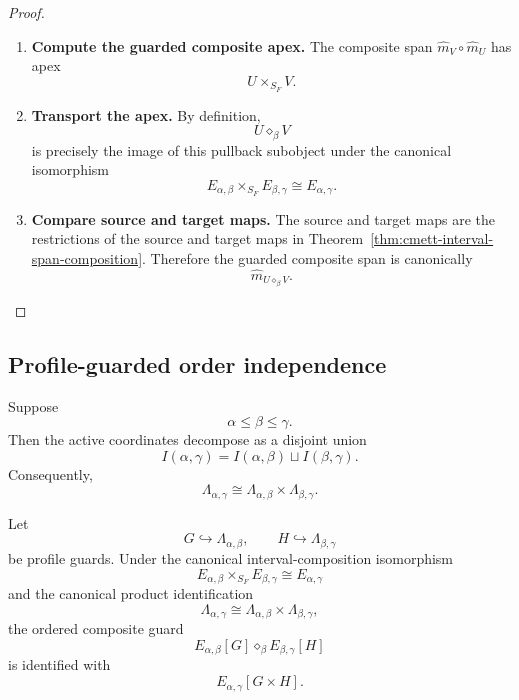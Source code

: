 \begin{proof}
    \leavevmode
    \begin{enumerate}
        \item \textbf{Compute the guarded composite apex.}
        The composite span \(\widehat m_V\circ\widehat m_U\) has apex
        \[
            U\times_{S_F}V.
        \]

        \item \textbf{Transport the apex.}
        By definition,
        \[
            U\diamond_\beta V
        \]
        is precisely the image of this pullback subobject under the canonical
        isomorphism
        \[
            E_{\alpha,\beta}\times_{S_F}E_{\beta,\gamma}
            \cong E_{\alpha,\gamma}.
        \]

        \item \textbf{Compare source and target maps.}
        The source and target maps are the restrictions of the source and
        target maps in Theorem~\ref{thm:cmett-interval-span-composition}.
        Therefore the guarded composite span is canonically
        \[
            \widehat m_{U\diamond_\beta V}.
        \]
    \end{enumerate}
\end{proof}

\subsection{Profile-guarded order independence}
\label{subsec:cmett-profile-guarded-order-independence}

Suppose
\[
    \alpha\leq\beta\leq\gamma.
\]
Then the active coordinates decompose as a disjoint union
\[
    I(\alpha,\gamma)
    =
    I(\alpha,\beta)\sqcup I(\beta,\gamma).
\]
Consequently,
\[
    \Lambda_{\alpha,\gamma}
    \cong
    \Lambda_{\alpha,\beta}\times\Lambda_{\beta,\gamma}.
\]

\begin{proposition}
\label{prop:cmett-composite-profile-guards}
    Let
    \[
        G\hookrightarrow\Lambda_{\alpha,\beta},
        \qquad
        H\hookrightarrow\Lambda_{\beta,\gamma}
    \]
    be profile guards. Under the canonical interval-composition isomorphism
    \[
        E_{\alpha,\beta}\times_{S_F}E_{\beta,\gamma}
        \cong
        E_{\alpha,\gamma}
    \]
    and the canonical product identification
    \[
        \Lambda_{\alpha,\gamma}
        \cong
        \Lambda_{\alpha,\beta}\times\Lambda_{\beta,\gamma},
    \]
    the ordered composite guard
    \[
        E_{\alpha,\beta}[G]\diamond_\beta E_{\beta,\gamma}[H]
    \]
    is identified with
    \[
        E_{\alpha,\gamma}[G\times H].
    \]
\end{proposition}

